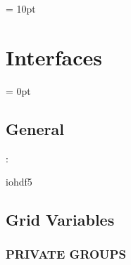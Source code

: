 \documentclass{article}
\begin{document}
\vspace{0.5cm}\parskip = 10pt 

\section{Interfaces} 


\parskip = 0pt

\vspace{3mm} \subsection*{General}

: 

iohdf5
\vspace{2mm}
\subsection*{Grid Variables}
\vspace{5mm}\subsubsection{PRIVATE GROUPS}

\vspace{5mm}
\end{document}
